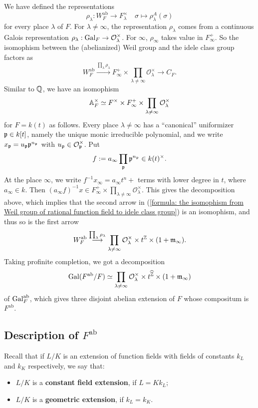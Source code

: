 \documentclass{article}
\renewcommand{\O}{\mathcal{O}}
\newcommand{\m}{\mathfrak{m}}
\DeclareMathOperator{\frob}{Frob}
\newcommand{\ab}{\mathrm{ab}}
\begin{document}
We have defined the representations \[\rho_\lambda : W_F^\ab\to F_\lambda^\times\quad \sigma\mapsto \rho_\lambda^A(\sigma)\]
for every place $\lambda$ of $F$.
For $\lambda\ne \infty$, the representation $\rho_\lambda$ comes from a continuous Galois representation $\rho_\lambda :\gal_F\to \O_\lambda^\times$.
For $\infty$, $\rho_\infty$ takes value in $F_\infty^+$.
So the isomophism between the (abelianized) Weil group and the idele class group factors as
\begin{equation}\label{formula: the isomophism from Weil group of rational function field to idele class group}
    W_F^\ab \stackrel{\prod_{\lambda}\rho_\lambda}{\longrightarrow} F_\infty^+\times\prod_{\lambda\ne\infty}\O_\lambda^\times\to C_F.
\end{equation}
Similar to $\mathbb{Q}$, we have an isomophism\[\A_F^\times \simeq F^\times \times F_\infty^+\times \prod_{\lambda\ne \infty} \O_\lambda^\times\]
for $F = k(t)$ as follows.
Every place $\lambda\ne\infty$ has a ``canonical'' uniformizer $\mathfrak{p}\in k[t]$, namely the unique monic irreducible polynomial,
and we write $x_{\mathfrak{p}} = u_{\mathfrak{p}}\mathfrak{p}^{n_{\mathfrak{p}}}$ with $u_\p\in \O_\p^\times$.
Put \[f := a_\infty\prod_{\mathfrak{p}}\mathfrak{p}^{n_{\mathfrak{p}}}\in k(t)^\times.\]
At the place $\infty$, we write $f^{-1}x_\infty = a_\infty t^{n} + {}$ terms with lower degree in $t$, where $a_\infty\in k$.
Then $(a_\infty f)^{-1}x\in F_\infty^+\times\prod_{\lambda\ne\infty}\O_\lambda^\times$.
This gives the decomposition above,
which implies that the second arrow in (\ref{formula: the isomophism from Weil group of rational function field to idele class group}) is an isomophism, and thus so is the first arrow
\[W_F^\ab\stackrel{\prod_{\lambda}\rho_\lambda}{\longrightarrow} \prod_{\lambda\ne\infty}\O_\lambda^\times \times t^{\Z}\times (1 + \m_\infty).\]
Taking profinite completion, we got a decomposition
\[\gal(F^\ab/F)
\simeq \prod_{\lambda\ne\infty}\O_\lambda^\times \times t^{\hat\Z}\times (1 + \m_\infty)\]
of $\gal_F^\ab$, which gives three disjoint abelian extension of $F$ whose compositum is $F^\ab$.

\subsection*{Description of \texorpdfstring{$F^\ab$}{F^ab}}
Recall that if $L/K$ is an extension of function fields with fields of constants $k_L$ and $k_K$ respectively, we say that:
\begin{itemize}
    \item $L/K$ is a \textbf{constant field extension}, if $L = Kk_L$;
    \item $L/K$ is a \textbf{geometric extension}, if $k_L = k_K$.
\end{itemize}
\end{document}
